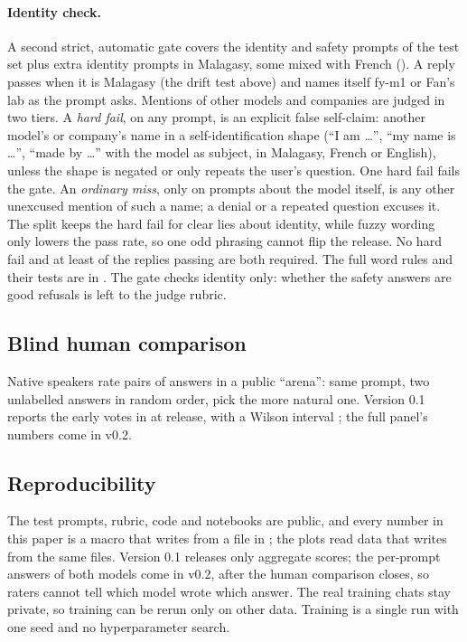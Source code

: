 \documentclass[11pt]{article}
\begin{document}
\paragraph{Identity check.} A second strict, automatic gate covers the identity and safety prompts of the
test set plus extra identity prompts in Malagasy, some mixed with French ().
A reply passes when it is Malagasy (the drift test above) and names itself fy-m1 or Fan's lab as the
prompt asks. Mentions of other models and companies are judged in two tiers. A \emph{hard fail}, on any
prompt, is an explicit false self-claim: another model's or company's name in a self-identification shape
(``I am \ldots'', ``my name is \ldots'', ``made by \ldots'' with the model as subject, in Malagasy, French
or English), unless the shape is negated or only repeats the user's question. One hard fail fails the
gate. An \emph{ordinary miss}, only on prompts about the model itself, is any other unexcused mention of
such a name; a denial or a repeated question excuses it. The split keeps the hard fail for clear lies
about identity, while fuzzy wording only lowers the pass rate, so one odd phrasing cannot flip the
release. No hard fail and at least \fyIdentityThreshold{} of the \fyIdentityN{} replies passing are both
required. The full word rules and their tests are in . The gate
checks identity only: whether the safety answers are good refusals is left to the judge rubric.

\subsection{Blind human comparison}
\label{sec:arena}
Native speakers rate pairs of answers in a public ``arena'': same prompt, two unlabelled answers in random
order, pick the more natural one. Version 0.1 reports the early votes in at release, with a Wilson
interval \citep{wilson1927}; the full panel's numbers come in v0.2.

\subsection{Reproducibility}
The test prompts, rubric, code and notebooks are public, and every number in this paper is a macro that
 writes from a file in ; the plots read data that
 writes from the same files. Version 0.1 releases only aggregate scores; the
per-prompt answers of both models come in v0.2, after the human comparison closes, so raters cannot tell
which model wrote which answer. The real training chats stay private, so training can be rerun only on
other data. Training is a single run with one seed and no hyperparameter search.
\end{document}
